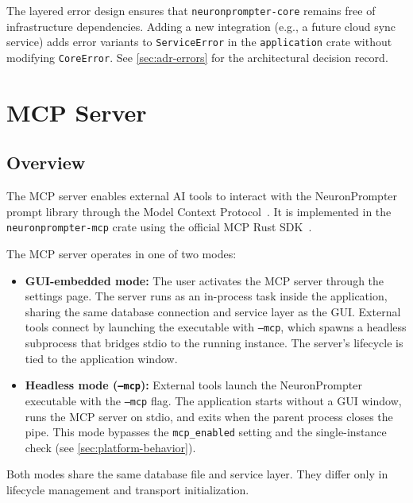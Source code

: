 \documentclass[a4paper, 11pt, oneside]{report}
\begin{document}
The layered error design ensures that \texttt{neuronprompter-core}
remains free of infrastructure dependencies.  Adding a new integration
(e.g., a future cloud sync service) adds error variants to
\texttt{ServiceError} in the \texttt{application} crate without
modifying \texttt{CoreError}.  See \cref{sec:adr-errors} for the
architectural decision record.


\chapter{MCP Server}
\label{ch:mcp}

\section{Overview}
\label{sec:mcp-overview}

The MCP server enables external AI tools to interact with the
NeuronPrompter prompt library through the Model Context
Protocol~\cite{mcp_spec}.  It is implemented in the
\texttt{neuronprompter-mcp} crate using the official MCP Rust
SDK~\cite{mcp_rust_sdk}.

The MCP server operates in one of two modes:

\begin{itemize}
  \item \textbf{GUI-embedded mode:} The user activates the MCP server
        through the settings page.  The server runs as an in-process
        task inside the application, sharing the same database
        connection and service layer as the GUI.  External tools connect
        by launching the executable with \texttt{--mcp}, which spawns a
        headless subprocess that bridges stdio to the running instance.
        The server's lifecycle is tied to the application window.
  \item \textbf{Headless mode (\texttt{--mcp}):} External tools launch
        the NeuronPrompter executable with the \texttt{--mcp} flag.
        The application starts without a GUI window, runs the MCP server
        on stdio, and exits when the parent process closes the pipe.
        This mode bypasses the \texttt{mcp\_enabled} setting and the
        single-instance check (see \cref{sec:platform-behavior}).
\end{itemize}

Both modes share the same database file and service layer.  They differ
only in lifecycle management and transport initialization.
\end{document}
